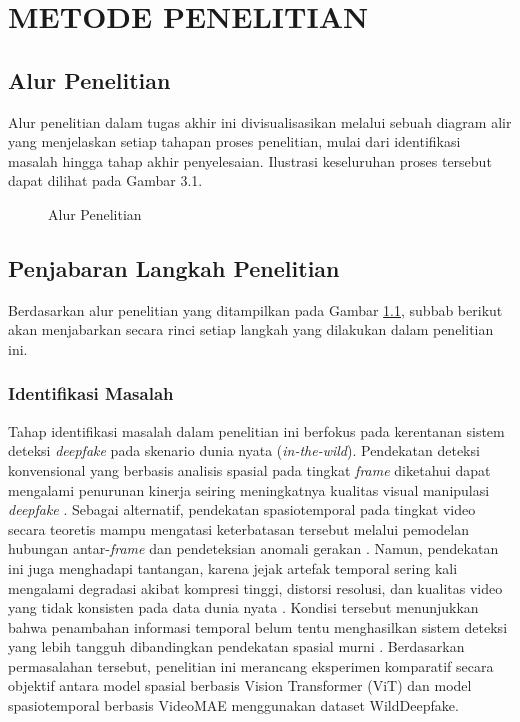 \newpage
\chapter{METODE PENELITIAN} \label{Bab III}

\section{Alur Penelitian} \label{III.Alur}
Alur penelitian dalam tugas akhir ini divisualisasikan melalui sebuah diagram alir yang menjelaskan setiap tahapan proses penelitian, mulai dari identifikasi masalah hingga tahap akhir penyelesaian. Ilustrasi keseluruhan proses tersebut dapat dilihat pada Gambar 3.1. \par

\begin{figure}[H] %
    \centering
    \caption{Alur Penelitian}
    \label{fig:3.alur}
\end{figure}

\section{Penjabaran Langkah Penelitian} \label{III.Jabar Alur}
Berdasarkan alur penelitian yang ditampilkan pada Gambar \ref{fig:3.alur}, subbab berikut akan menjabarkan secara rinci setiap langkah yang dilakukan dalam penelitian ini. \par

\subsection{Identifikasi Masalah} \label{III.Identifikasi Masalah}
Tahap identifikasi masalah dalam penelitian ini berfokus pada kerentanan sistem deteksi \textit{deepfake} pada skenario dunia nyata (\textit{in-the-wild}). Pendekatan deteksi konvensional yang berbasis analisis spasial pada tingkat \textit{frame} diketahui dapat mengalami penurunan kinerja seiring meningkatnya kualitas visual manipulasi \textit{deepfake} \cite{Cao2022}\cite{Lin2025}. Sebagai alternatif, pendekatan spasiotemporal pada tingkat video secara teoretis mampu mengatasi keterbatasan tersebut melalui pemodelan hubungan antar-\textit{frame} dan pendeteksian anomali gerakan \cite{Gu2021}. Namun, pendekatan ini juga menghadapi tantangan, karena jejak artefak temporal sering kali mengalami degradasi akibat kompresi tinggi, distorsi resolusi, dan kualitas video yang tidak konsisten pada data dunia nyata \cite{Zi2024}\cite{Hsu2020}. Kondisi tersebut menunjukkan bahwa penambahan informasi temporal belum tentu menghasilkan sistem deteksi yang lebih tangguh dibandingkan pendekatan spasial murni \cite{Haliassos2021}. Berdasarkan permasalahan tersebut, penelitian ini merancang eksperimen komparatif secara objektif antara model spasial berbasis Vision Transformer (ViT) dan model spasiotemporal berbasis VideoMAE menggunakan dataset WildDeepfake. \par

